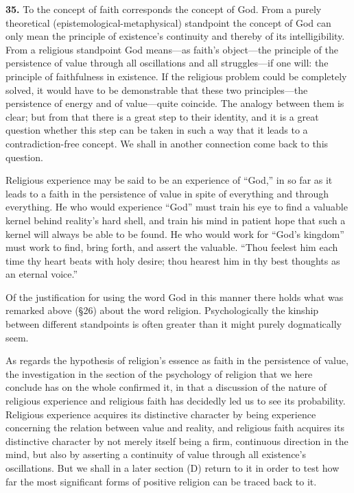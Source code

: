 \documentclass[12pt,a4paper]{book}
\newcommand{\opage}[1]{\marginnote{\footnotesize\textit{[#1]}}}
\begin{document}
\noindent\textbf{35.} To the concept of faith corresponds the concept of God. From a
purely theoretical (epistemological-metaphysical) standpoint the concept of God can
only mean the principle of existence's continuity and thereby of its
intelligibility. From a religious standpoint God means---as faith's object---the
principle of the persistence of value through all oscillations and all struggles---if
one will: the principle of faithfulness in existence. If the religious problem could
be completely solved, it would have to be demonstrable that these two principles---the
persistence of energy and of value---quite coincide. The analogy between them is
clear; but from that there is a great step to their identity, and it is a great
question whether this step can be taken in such a way that it leads to a
contradiction-free concept. We shall in another connection come back to this question.

Religious experience may be said to be an experience of ``God,'' in so far as it leads
to a faith in the persistence of value in spite of everything and through everything.
He who would experience ``God'' must train his eye to find a valuable kernel behind
reality's hard shell, and train his mind in patient hope that such a kernel will
always be able to be found. He who would work for ``God's kingdom'' must work 
\opage{84}to find,
bring forth, and assert the valuable. ``Thou feelest him each time thy heart beats with
holy desire; thou hearest him in thy best thoughts as an eternal voice.''

Of the justification for using the word God in this manner there holds what was
remarked above (§26) about the word religion. Psychologically the kinship between
different standpoints is often greater than it might purely dogmatically seem.

As regards the hypothesis of religion's essence as faith in the persistence of value,
the investigation in the section of the psychology of religion that we here conclude
has on the whole confirmed it, in that a discussion of the nature of religious
experience and religious faith has decidedly led us to see its probability. Religious
experience acquires its distinctive character by being experience concerning the
relation between value and reality, and religious faith acquires its distinctive
character by not merely itself being a firm, continuous direction in the mind, but
also by asserting a continuity of value through all existence's oscillations. But we
shall in a later section (D) return to it in order to test how far the most significant
forms of positive religion can be traced back to it.
\end{document}
